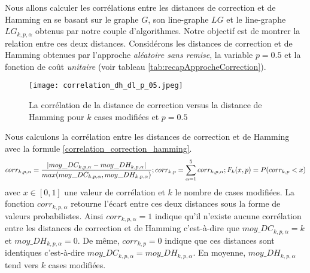  \label{relationMoyDHmoyDC}
 
Nous allons calculer les corr\'elations entre les distances de correction et de Hamming en se basant sur le  graphe $G$, son line-graphe $LG$ et le line-graphe $LG_{k,p, \alpha}$ obtenus par notre couple d'algorithmes.
Notre objectif est de montrer la relation entre ces deux distances.
\newline
Consid\'erons les distances de correction et de Hamming obtenues par l'approche {\em al\'eatoire sans remise}, la variable $p = 0.5$ et la fonction de co\^ut {\em unitaire} (voir tableau \ref{tab:recapApprocheCorrection}).

 \begin{figure}[htb!] 
\centering
\texttt{[image: correlation\_dh\_dl\_p\_05.jpeg]}
\caption{ La corr\'elation de la distance de correction versus la distance de Hamming pour $k$ cases modifi\'ees et $p = 0.5$ }
\label{dh_vs_dc_p_05} 
\end{figure}
\FloatBarrier

Nous calculons la corr\'elation entre les distances de correction et de Hamming avec la formule \ref{correlation_correction_hamming}.
\begin{equation}
	corr_{k,p,\alpha} =  \frac{ | moy\_DC_{k, p,\alpha} - moy\_DH_{k,p, \alpha} | }{ max(moy\_DC_{k, p,\alpha},  moy\_DH_{k, p, \alpha}) };
	\\
	corr_{k,p} = \sum_{\alpha = 1}^{5}corr_{k,p,\alpha} ;
	\\ \newline
	F_k (x,p) = P(corr_{k,p} < x ) 
\label{correlation_correction_hamming}
\end{equation}
avec $x \in [0,1]$ une valeur de corr\'elation et $k$ le nombre de cases modifi\'ees. 
La fonction $corr_{k,p,\alpha}$ retourne l'\'ecart entre ces deux distances sous la forme de valeurs probabilistes. 
Ainsi $corr_{k,p,\alpha} = 1$ indique qu'il n'existe aucune corr\'elation entre les distances de correction et de Hamming c'est-\`a-dire que $moy\_DC_{k,p,\alpha} = k$ et $moy\_DH_{k,p,\alpha} = 0$.
De m\^eme, $corr_{k,p} = 0$ indique que ces distances sont identiques c'est-\`a-dire $ moy\_DC_{k, p, \alpha} = moy\_DH_{k,p, \alpha}$. En moyenne, $moy\_DH_{k,p, \alpha}$ tend vers $k$ cases modifi\'ees. 
\newline

